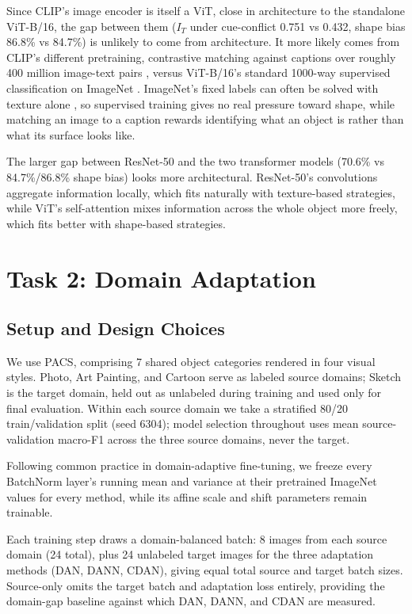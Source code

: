\documentclass{article}
\begin{document}
Since CLIP's image encoder is itself a ViT, close in architecture to the standalone ViT-B/16, the gap between them ($I_T$ under cue-conflict 0.751 vs 0.432, shape bias 86.8\% vs 84.7\%) is unlikely to come from architecture. It more likely comes from CLIP's different pretraining, contrastive matching against captions over roughly 400 million image-text pairs \citep{radford2021clip}, versus ViT-B/16's standard 1000-way supervised classification on ImageNet \citep{dosovitskiy2021vit}. ImageNet's fixed labels can often be solved with texture alone \citep{geirhos2019imagenet}, so supervised training gives no real pressure toward shape, while matching an image to a caption rewards identifying what an object is rather than what its surface looks like.

The larger gap between ResNet-50 and the two transformer models (70.6\% vs 84.7\%/86.8\% shape bias) looks more architectural. ResNet-50's convolutions aggregate information locally, which fits naturally with texture-based strategies, while ViT's self-attention mixes information across the whole object more freely, which fits better with shape-based strategies.
\section{Task 2: Domain Adaptation}
\label{sec:task2}

\subsection{Setup and Design Choices}

We use PACS, comprising 7 shared object categories rendered in four visual styles. Photo, Art Painting, and Cartoon serve as labeled source domains; Sketch is the target domain, held out as unlabeled during training and used only for final evaluation. Within each source domain we take a stratified 80/20 train/validation split (seed 6304); model selection throughout uses mean source-validation macro-F1 across the three source domains, never the target.

Following common practice in domain-adaptive fine-tuning, we freeze every BatchNorm layer's running mean and variance at their pretrained ImageNet values for every method, while its affine scale and shift parameters remain trainable.

Each training step draws a domain-balanced batch: 8 images from each source domain (24 total), plus 24 unlabeled target images for the three adaptation methods (DAN, DANN, CDAN), giving equal total source and target batch sizes. Source-only omits the target batch and adaptation loss entirely, providing the domain-gap baseline against which DAN, DANN, and CDAN are measured.
\end{document}
